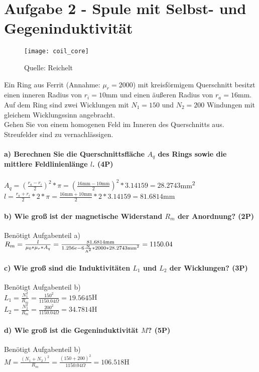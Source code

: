 \documentclass{article}
\begin{document}
\part*{Aufgabe 2 - Spule mit Selbst- und Gegeninduktivität}

\begin{wrapfigure}{r}{0.3\textwidth}
\centering
\texttt{[image: coil\_core]}
\caption*{Quelle: Reichelt}
\end{wrapfigure}
Ein Ring aus Ferrit (Annahme: $\mu_r = 2000$) mit kreisförmigem Querschnitt besitzt einen inneren Radius von $r_i = 10$mm und einen äußeren Radius von $r_a = 16$mm. Auf dem Ring sind zwei Wicklungen mit $N_1 = 150$ und $N_2 = 200$ Windungen mit gleichem Wicklungssinn angebracht.\\Gehen Sie von einem homogenen Feld im Inneren des Querschnitts aus. Streufelder sind zu vernachlässigen.\\
\subsection*{a) Berechnen Sie die Querschnittsfläche $A_q$ des Rings sowie die mittlere Feldlinienlänge $l$. (4P)}

$A_q = (\frac{r_a - r_i}{2})^2 * \pi = (\frac{ 16\text{mm}- 10\text{mm}}{2})^2 * 3.14159= 28.2743$mm\textsuperscript{2}\\\hfill \break$l = \frac{r_a + r_i}{2} * 2 * \pi = \frac{ 16\text{mm}+ 10\text{mm}}{2} * 2 * 3.14159= 81.6814$mm\\
\subsection*{b) Wie groß ist der magnetische Widerstand $R_m$ der Anordnung? (2P)}

Benötigt Aufgabenteil a)\\\hfill \break$R_m = \frac{l}{\mu_0 * \mu_r * A_q} = \frac{ 81.6814\text{mm}}{ 1.256e-6\frac{\text{N}}{\text{A\textsuperscript{2}}} * 2000* 28.2743\text{mm\textsuperscript{2}}} = 1150.04$\textOmega\\
\subsection*{c) Wie groß sind die Induktivitäten $L_1$ und $L_2$ der Wicklungen? (3P)}

Benötigt Aufgabenteil b)\\\hfill \break$L_1 = \frac{N_1^2}{R_m} = \frac{ 150^2}{ 1150.04\Omega} = 19.5645$H\\\hfill \break$L_2 = \frac{N_2^2}{R_m} = \frac{ 200^2}{ 1150.04\Omega} = 34.7814$H\\
\subsection*{d) Wie groß ist die Gegeninduktivität $M$? (5P)}

Benötigt Aufgabenteil b)\\\hfill \break$M = \frac{(N_1 + N_2)^2}{R_m} = \frac{( 150+ 200)^2}{ 1150.04\Omega} = 106.518$H\\
\end{document}
